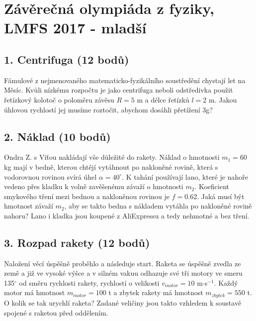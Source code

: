 \documentclass[12pt,a4paper]{article}
\author{Ondřej Zelenka}
\begin{document}

\section*{Závěrečná olympiáda z fyziky, LMFS 2017 - mladší}

\subsection*{1. Centrifuga (12 bodů)}
Fámulové z nejmenovaného matematicko-fyzikálního soustředění chystají let na Měsíc. Kvůli nízkému rozpočtu je jako centrifuga neboli odstředivka použit řetízkový kolotoč o poloměru závěsu $R = 5$ m a délce řetízků $l = 2$ m. Jakou úhlovou rychlostí jej musíme roztočit, abychom dosáhli přetížení 3g?

\subsection*{2. Náklad (10 bodů)}
Ondra Z. s Víťou nakládají vše důležité do rakety. Náklad o hmotnosti $m_1 = 60$ kg mají v bedně, kterou chtějí vytáhnout po nakloněné rovině, která s vodorovnou rovinou svírá úhel $\alpha = 40^\circ$. K tahání používají lano, které je nahoře vedeno přes kladku k volně zavěšenému závaží o hmotnosti $m_2$. Koeficient smykového tření mezi bednou a nakloněnou rovinou je $f = 0.62$. Jaká musí být hmotnost závaží $m_2$, aby se takto bedna s nákladem vytáhla po nakloněné rovině nahoru? Lano i kladka jsou koupené z AliExpressu a tedy nehmotné a bez tření.


\subsection*{3. Rozpad rakety (12 bodů)}
Naložení věcí úspěšně proběhlo a následuje start. Raketa se úspěšně zvedla ze země a již ve vysoké výšce a v silném vakuu odhazuje své tři motory ve smeru 135$^\circ$ od směru rychlosti rakety, rychlostí o velikosti $v_{motor} = 10$ m$\cdot$s$^{-1}$. Každý motor má hmotnost $m_{motor} = 100$ t a zbytek rakety má hmotnost $m_{zbytek} = 550$ t. O kolik se tak urychlí raketa? Zadané veličiny jsou takto vzhledem k soustavě spojené s raketou před oddělením.
\end{document}
